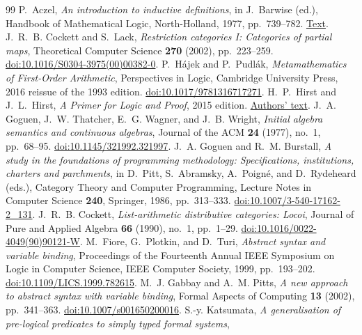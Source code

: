 \documentclass[11pt]{article}
\theoremstyle{definition}\newtheorem{definition}[theorem]{Definition}
\begin{document}
\begin{thebibliography}{99}
P.~Aczel, \emph{An introduction to inductive definitions},
in J.~Barwise (ed.), Handbook of Mathematical Logic,
North-Holland, 1977, pp.~739--782.
\href{https://lawrencecpaulson.github.io/papers/Aczel-Inductive-Defs.pdf}{Text}.
J.~R.~B. Cockett and S.~Lack, \emph{Restriction categories I:
Categories of partial maps}, Theoretical Computer Science
\textbf{270} (2002), pp.~223--259.
\href{https://doi.org/10.1016/S0304-3975(00)00382-0}{doi:10.1016/S0304-3975(00)00382-0}.
P.~H\'ajek and P.~Pudl\'ak, \emph{Metamathematics of First-Order
Arithmetic}, Perspectives in Logic, Cambridge University Press,
2016 reissue of the 1993 edition.
\href{https://doi.org/10.1017/9781316717271}{doi:10.1017/9781316717271}.
H.~P.~Hirst and J.~L.~Hirst, \emph{A Primer for Logic and Proof},
2015 edition.
\href{https://www.appstate.edu/~hirstjl/primer/hirst.pdf}{Authors' text}.
J.~A. Goguen, J.~W. Thatcher, E.~G. Wagner, and J.~B. Wright,
\emph{Initial algebra semantics and continuous algebras},
Journal of the ACM \textbf{24} (1977), no.~1, pp.~68--95.
\href{https://doi.org/10.1145/321992.321997}{doi:10.1145/321992.321997}.
J.~A. Goguen and R.~M. Burstall,
\emph{A study in the foundations of programming methodology:
Specifications, institutions, charters and parchments},
in D.~Pitt, S.~Abramsky, A.~Poign\'e, and D.~Rydeheard (eds.),
Category Theory and Computer Programming, Lecture Notes in Computer
Science \textbf{240}, Springer, 1986, pp.~313--333.
\href{https://doi.org/10.1007/3-540-17162-2_131}{doi:10.1007/3-540-17162-2\_131}.
J.~R.~B. Cockett, \emph{List-arithmetic distributive categories: Locoi},
Journal of Pure and Applied Algebra \textbf{66} (1990), no.~1, pp.~1--29.
\href{https://doi.org/10.1016/0022-4049(90)90121-W}{doi:10.1016/0022-4049(90)90121-W}.
M.~Fiore, G.~Plotkin, and D.~Turi,
\emph{Abstract syntax and variable binding},
Proceedings of the Fourteenth Annual IEEE Symposium on Logic in
Computer Science, IEEE Computer Society, 1999, pp.~193--202.
\href{https://doi.org/10.1109/LICS.1999.782615}{doi:10.1109/LICS.1999.782615}.
M.~J. Gabbay and A.~M. Pitts,
\emph{A new approach to abstract syntax with variable binding},
Formal Aspects of Computing \textbf{13} (2002), pp.~341--363.
\href{https://doi.org/10.1007/s001650200016}{doi:10.1007/s001650200016}.
S.-y. Katsumata,
\emph{A generalisation of pre-logical predicates to simply typed formal systems},

\end{thebibliography}
\end{document}
